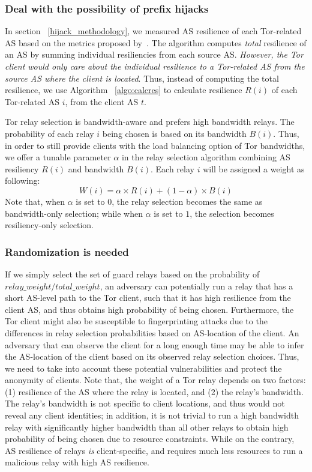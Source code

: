 \subsubsection{Deal with the possibility of prefix hijacks}

In section ~\ref{hijack_methodology}, we measured AS resilience of each Tor-related AS based on the metrics proposed by~\cite{lad2007understanding}. The algorithm computes \emph{total} resilience of an AS by summing individual resiliencies from each source AS. \emph{However, the Tor client would only care about the individual resilience to a Tor-related AS from the source AS where the client is located}. Thus, instead of computing the total resilience, we use Algorithm ~\ref{algo:calcres} to calculate resilience $R(i)$ of each Tor-related AS $i$, from the client AS $t$. 

Tor relay selection is bandwidth-aware and prefers high bandwidth relays. The probability of each relay $i$ being chosen is based on its bandwidth $B(i)$. Thus, in order to still provide clients with the load balancing option of Tor bandwidths, we offer a tunable parameter $\alpha$ in the relay selection algorithm combining AS resiliency $R(i)$ and bandwidth $B(i)$. Each relay $i$ will be assigned a weight as following:
\begin{equation*}
W(i) = \alpha \times R(i) + (1 - \alpha) \times B(i)
\end{equation*}
Note that, when $\alpha$ is set to $0$, the relay selection becomes the same as bandwidth-only selection; while when $\alpha$ is set to $1$, the selection becomes resiliency-only selection. 

\subsubsection{Randomization is needed}

If we simply select the set of guard relays based on the probability of $relay\_weight/total\_weight$, an adversary can potentially run a relay that has a short AS-level path to the Tor client, such that it has high resilience from the client AS, and thus obtains high probability of being chosen. Furthermore, the Tor client might also be susceptible to fingerprinting attacks due to the differences in relay selection probabilities based on AS-location of the client. An adversary that can observe the client for a long enough time may be able to infer the AS-location of the client based on its observed relay selection choices. Thus, we need to take into account these potential vulnerabilities and protect the anonymity of clients. Note that, the weight of a Tor relay depends on two factors: (1) resilience of the AS where the relay is located, and (2) the relay's bandwidth. The relay's bandwidth is not specific to client locations, and thus would not reveal any client identities; in addition, it is not trivial to run a high bandwidth relay with significantly higher bandwidth than all other relays to obtain high probability of being chosen due to resource constraints. While on the contrary, AS resilience of relays \emph{is} client-specific, and requires much less resources to run a malicious relay with high AS resilience.


